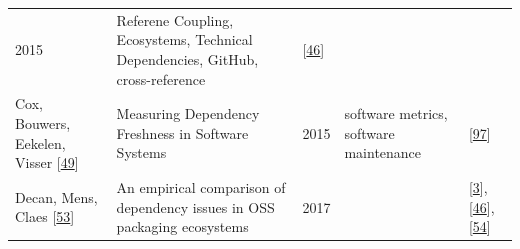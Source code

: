\documentclass[]{book}
\begin{document}
\begin{longtable}[]{@{}lllll@{}}
\begin{minipage}[t]{0.02\columnwidth}
2015\strut
\end{minipage} & \begin{minipage}[t]{0.24\columnwidth}\raggedright\strut
Referene Coupling, Ecosystems, Technical Dependencies, GitHub,
cross-reference\strut
\end{minipage} & \begin{minipage}[t]{0.16\columnwidth}\raggedright\strut
{[}\protect\hyperlink{ref-Constantinou2017}{46}{]}\strut
\end{minipage}\tabularnewline
\begin{minipage}[t]{0.12\columnwidth}\raggedright\strut
Cox, Bouwers, Eekelen, Visser
{[}\protect\hyperlink{ref-Cox2015}{49}{]}\strut
\end{minipage} & \begin{minipage}[t]{0.31\columnwidth}\raggedright\strut
Measuring Dependency Freshness in Software Systems\strut
\end{minipage} & \begin{minipage}[t]{0.02\columnwidth}\raggedright\strut
2015\strut
\end{minipage} & \begin{minipage}[t]{0.24\columnwidth}\raggedright\strut
software metrics, software maintenance\strut
\end{minipage} & \begin{minipage}[t]{0.16\columnwidth}\raggedright\strut
{[}\protect\hyperlink{ref-Kikas2017}{97}{]}\strut
\end{minipage}\tabularnewline
\begin{minipage}[t]{0.12\columnwidth}\raggedright\strut
Decan, Mens, Claes {[}\protect\hyperlink{ref-Decan2017}{53}{]}\strut
\end{minipage} & \begin{minipage}[t]{0.31\columnwidth}\raggedright\strut
An empirical comparison of dependency issues in OSS packaging
ecosystems\strut
\end{minipage} & \begin{minipage}[t]{0.02\columnwidth}\raggedright\strut
2017\strut
\end{minipage} & \begin{minipage}[t]{0.24\columnwidth}\raggedright\strut
\strut
\end{minipage} & \begin{minipage}[t]{0.16\columnwidth}\raggedright\strut
{[}\protect\hyperlink{ref-Abdalkareem2017}{3}{]},
{[}\protect\hyperlink{ref-Constantinou2017}{46}{]},
{[}\protect\hyperlink{ref-Decan2018}{54}{]}\strut
\end{minipage}\tabularnewline

\end{longtable}
\end{document}
